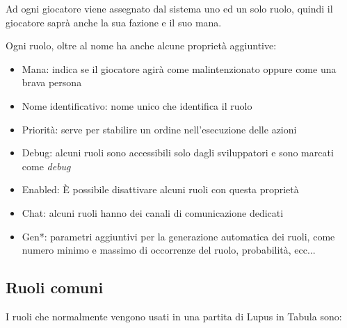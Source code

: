 Ad ogni giocatore viene assegnato dal sistema uno ed un solo ruolo, quindi il giocatore saprà anche la sua fazione e il suo mana. 

Ogni ruolo, oltre al nome ha anche alcune proprietà aggiuntive:

\begin{itemize}
	\item Mana: indica se il giocatore agirà come malintenzionato oppure come una brava persona
	\item Nome identificativo: nome unico che identifica il ruolo
	\item Priorità: serve per stabilire un ordine nell'esecuzione delle azioni
	\item Debug: alcuni ruoli sono accessibili solo dagli sviluppatori e sono marcati come \emph{debug}
	\item Enabled: È possibile disattivare alcuni ruoli con questa proprietà
	\item Chat: alcuni ruoli hanno dei canali di comunicazione dedicati
	\item Gen*: parametri aggiuntivi per la generazione automatica dei ruoli, come numero minimo e massimo di occorrenze del ruolo, probabilità, ecc...
\end{itemize}

\subsection{Ruoli comuni}

I ruoli che normalmente vengono usati in una partita di Lupus in Tabula sono:





